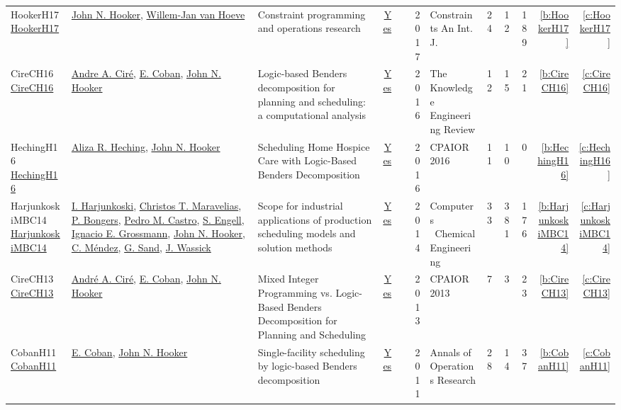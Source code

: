 {\begin{longtable}{>{\raggedright\arraybackslash}p{3cm}>{\raggedright\arraybackslash}p{6cm}>{\raggedright\arraybackslash}p{6.5cm}rrrp{2.5cm}rrrrr}
HookerH17 \href{http://dx.doi.org/10.1007/s10601-017-9280-3}{HookerH17} & \hyperref[auth:a162]{John N. Hooker}, \hyperref[auth:a845]{Willem-Jan van Hoeve} & Constraint programming and operations research & \href{../works/HookerH17.pdf}{Yes} & \cite{HookerH17} & 2017 & Constraints An Int. J. & 24 & 12 & 189 & \ref{b:HookerH17} & \ref{c:HookerH17}\\
CireCH16 \href{http://dx.doi.org/10.1017/s0269888916000254}{CireCH16} & \hyperref[auth:a912]{Andre A. Ciré}, \hyperref[auth:a341]{E. Coban}, \hyperref[auth:a162]{John N. Hooker} & Logic-based Benders decomposition for planning and scheduling: a computational analysis & \href{../works/CireCH16.pdf}{Yes} & \cite{CireCH16} & 2016 & The Knowledge Engineering Review & 12 & 15 & 21 & \ref{b:CireCH16} & \ref{c:CireCH16}\\
HechingH16 \href{https://doi.org/10.1007/978-3-319-33954-2\_14}{HechingH16} & \hyperref[auth:a323]{Aliza R. Heching}, \hyperref[auth:a162]{John N. Hooker} & Scheduling Home Hospice Care with Logic-Based Benders Decomposition & \href{../works/HechingH16.pdf}{Yes} & \cite{HechingH16} & 2016 & CPAIOR 2016 & 11 & 10 & 0 & \ref{b:HechingH16} & \ref{c:HechingH16}\\
HarjunkoskiMBC14 \href{http://dx.doi.org/10.1016/j.compchemeng.2013.12.001}{HarjunkoskiMBC14} & \hyperref[auth:a884]{I. Harjunkoski}, \hyperref[auth:a387]{Christos T. Maravelias}, \hyperref[auth:a959]{P. Bongers}, \hyperref[auth:a907]{Pedro M. Castro}, \hyperref[auth:a70]{S. Engell}, \hyperref[auth:a388]{Ignacio E. Grossmann}, \hyperref[auth:a162]{John N. Hooker}, \hyperref[auth:a960]{C. Méndez}, \hyperref[auth:a961]{G. Sand}, \hyperref[auth:a962]{J. Wassick} & Scope for industrial applications of production scheduling models and solution methods & \href{../works/HarjunkoskiMBC14.pdf}{Yes} & \cite{HarjunkoskiMBC14} & 2014 & Computers \  Chemical Engineering & 33 & 381 & 176 & \ref{b:HarjunkoskiMBC14} & \ref{c:HarjunkoskiMBC14}\\
CireCH13 \href{https://doi.org/10.1007/978-3-642-38171-3\_22}{CireCH13} & \hyperref[auth:a159]{Andr{\'{e}} A. Cir{\'{e}}}, \hyperref[auth:a341]{E. Coban}, \hyperref[auth:a162]{John N. Hooker} & Mixed Integer Programming vs. Logic-Based Benders Decomposition for Planning and Scheduling & \href{../works/CireCH13.pdf}{Yes} & \cite{CireCH13} & 2013 & CPAIOR 2013 & 7 & 3 & 23 & \ref{b:CireCH13} & \ref{c:CireCH13}\\
CobanH11 \href{http://dx.doi.org/10.1007/s10479-011-1031-z}{CobanH11} & \hyperref[auth:a341]{E. Coban}, \hyperref[auth:a162]{John N. Hooker} & Single-facility scheduling by logic-based Benders decomposition & \href{../works/CobanH11.pdf}{Yes} & \cite{CobanH11} & 2011 & Annals of Operations Research & 28 & 14 & 37 & \ref{b:CobanH11} & \ref{c:CobanH11}\\

\end{longtable}}
